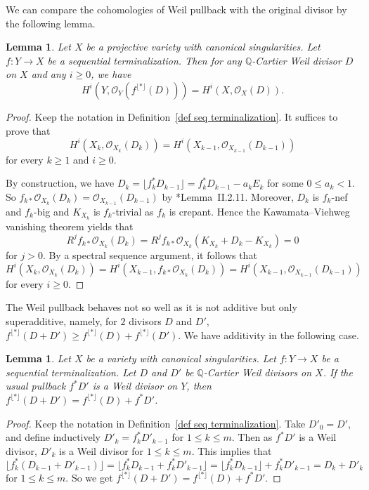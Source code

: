 \documentclass[12pt,twoside]{amsart}
\newtheorem{lem}[thm]{Lemma}
\theoremstyle{definition}
\begin{document}
We can compare the cohomologies of Weil pullback with the original divisor by the following lemma.

\begin{lem}\label{lem same coh}
    Let $X$ be a projective variety with canonical singularities. Let $f\colon Y\to X$ be a sequential terminalization. Then for any $\mathbb{Q}$-Cartier Weil divisor $D$ on $X$ and any $i\geq 0$, we have 
    \[
        H^i(Y, \mathcal O_Y(f^{\lfloor *\rfloor}(D)))=H^i(X, \mathcal O_X(D)).
    \]
\end{lem}

\begin{proof}
    Keep the notation in Definition~\ref{def seq terminalization}. It suffices to prove that \[H^i(X_k, \mathcal O_{X_k}(D_k))=H^i(X_{k-1}, \mathcal O_{X_{k-1}}(D_{k-1}))\] for every $k\geq 1$ and $i\geq 0$. %

    By construction, we have $D_k=\lfloor f_k^*D_{k-1} \rfloor=f_k^*D_{k-1}-a_kE_k$ for some $0\leq a_k<1$. So $f_{k*}\mathcal O_{X_k}(D_k)=\mathcal O_{X_{k-1}}(D_{k-1})$ by \cite{nakayama-zariski}*{Lemma~II.2.11}. Moreover, $D_k$ is $f_k$-nef and $f_k$-big and $K_{X_k}$ is $f_k$-trivial as $f_k$ is crepant. Hence the Kawamata--Viehweg vanishing theorem yields that
    \[
        R^jf_{k*}\mathcal O_{X_k}(D_k)=R^jf_{k*}\mathcal O_{X_k}(K_{X_k}+D_k-K_{X_k})=0
    \]
    for $j>0$. By a spectral sequence argument, it follows that 
    \[
        H^i(X_k, \mathcal O_{X_k}(D_k))=H^i(X_{k-1}, f_{k*}\mathcal O_{X_k}(D_k))=H^i(X_{k-1}, \mathcal O_{X_{k-1}}(D_{k-1}))
    \]
    for every $i\geq 0$. 
\end{proof}

The Weil pullback behaves not so well as it is not additive but only superadditive, namely, for $2$ divisors $D$ and $D'$, $f^{\lfloor *\rfloor}(D+D') \geq  f^{\lfloor *\rfloor}(D)+f^{\lfloor *\rfloor}(D')$. We have additivity in the following case.

\begin{lem}\label{lem pullback of D+G}
    Let $X$ be a variety with canonical singularities. Let $f\colon Y\to X$ be a sequential terminalization. Let $D$ and $D'$ be $\mathbb{Q}$-Cartier Weil divisors on $X$. If the usual pullback $f^*D'$ is a Weil divisor on $Y$, then $f^{\lfloor *\rfloor}(D+D') = f^{\lfloor *\rfloor}(D)+f^*D'$.
\end{lem}

\begin{proof}
    Keep the notation in Definition~\ref{def seq terminalization}. Take $D'_0=D'$, and define inductively $D'_k= f_k^*D'_{k-1} $ for $1\leq k\leq m$. Then as $f^*D'$ is a Weil divisor, $D'_k$ is a Weil divisor for $1\leq k\leq m$. This implies that 
    \[
        \lfloor f_k^*(D_{k-1}+D'_{k-1}) \rfloor=\lfloor f_k^*D_{k-1} +f_k^*D'_{k-1}\rfloor=\lfloor f_k^*D_{k-1} \rfloor +f_k^*D'_{k-1}=D_{k}+D'_k 
    \] 
    for $1\leq k\leq m$. So we get $f^{\lfloor *\rfloor}(D+D') = f^{\lfloor *\rfloor}(D)+f^*D'$.
\end{proof}
 
\end{document}
